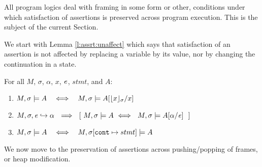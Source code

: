 All program logics deal with framing in some form or other, \ie conditions under which  satisfaction of  assertions is preserved across program execution. 
This is the subject of the current Section.

We start with  Lemma \ref{l:assrt:unaffect}  which says that satisfaction of an assertion is not affected by replacing a variable by its value, nor by changing the continuation in a state.


\begin{lemma}
\label{lemma:addr:expr}
\label{l:assrt:unaffect}
For all $M$, $\sigma$, $\alpha$, $x$, $\mathit{e}$, $stmt$, and $A$:

\begin{enumerate}
\item
\label{one:ad:exp}
$ \satisfiesA{M}{\sigma}{A}   \ \ \ \Longleftrightarrow\ \ \ \satisfiesA{M}{\sigma}{A[{\interpret \sigma x}/x]} $ 
\item
$\eval{M}{\sigma}{{\re}}{\alpha}  \ \ \Longrightarrow\ \  [ \ \satisfiesA{M}{\sigma}{A} \  \Longleftrightarrow\   \  \satisfiesA{M}{\sigma}{A[\alpha/\re]} \  \  ]$
\item
$ \satisfiesA{M}{\sigma}{A}   \ \ \ \Longleftrightarrow\ \ \ \satisfiesA{M}{\sigma[\prg{cont}\mapsto stmt]}{A}$ 
\end{enumerate}

\end{lemma}

We now move to the preservation of assertions across pushing/popping of frames, or heap modification.


